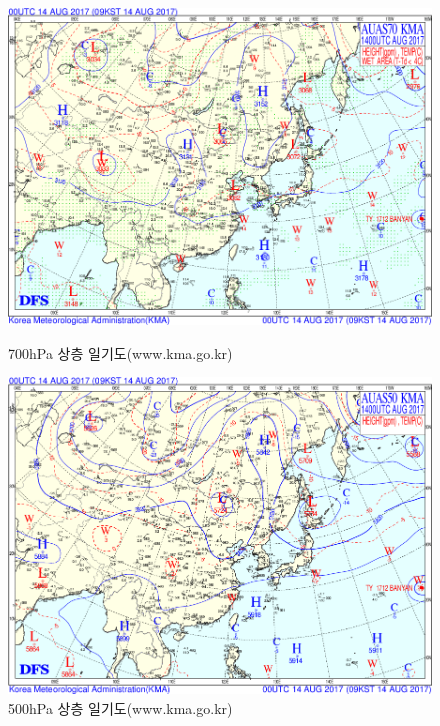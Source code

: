 \begin{figure}[p]\centering
	\begin{minipage}{0.97\textwidth}
	\includegraphics[width=0.97\linewidth]{22Weather_forecasting/images/up70_2017081400}
		\caption{700hPa 상층 일기도(www.kma.go.kr)}
		\label{fig:draw-weathermapsurf70}
	\end{minipage}
	\begin{minipage}{0.97\textwidth}
	\includegraphics[width=0.97\linewidth]{22Weather_forecasting/images/up50_2017081400}
		\caption{500hPa 상층 일기도(www.kma.go.kr)}
		\label{fig:draw-weathermapsurf50}
	\end{minipage}
\end{figure}

